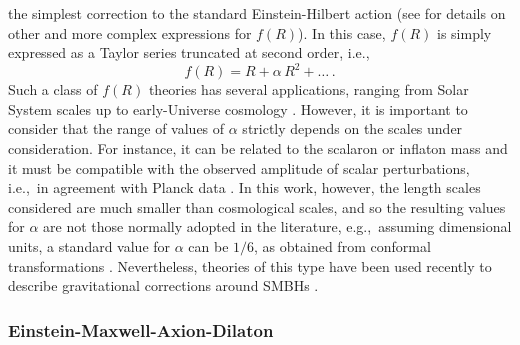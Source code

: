 \documentclass[a4paper,aps,twocolumn,showpacs,showkeys,nofootinbib,preprintnumbers,superscriptaddress,amsmath,amssymb,amsfonts]{revtex4-1}
\newcommand{\ie}{{i.e.,}~}
\newcommand{\eg}{{e.g.,}~}
\begin{document}
the simplest correction to the standard Einstein-Hilbert
action (see \cite{Capozziello2012} for details on other and more complex
expressions for $f(R)$). In this case, $f(R)$ is simply expressed
as a Taylor series truncated at second order, \ie
%
\begin{equation} \label{fRL}
f(R) = R + \alpha\, R^2 + \ldots \,.
\end{equation}
%
Such a class of $f(R)$ theories has several applications, ranging from
Solar System scales up to early-Universe cosmology
\citep{DeLaurentis2015}. However, it is important to consider that the
range of values of $\alpha$ strictly depends on the scales under
consideration. For instance, it can be related to the scalaron or
inflaton mass and it must be compatible with the observed
amplitude of scalar perturbations, \ie in agreement with Planck
data \cite{Planck2016a,BICEP2014}.
In this work, however, the
length scales considered are much smaller than cosmological
scales, and so the resulting values for $\alpha$ are not those normally
adopted in the literature, 
\eg assuming dimensional units, a standard value for $\alpha$ can be $1/6$,
as obtained from conformal transformations \citep[see][for further details]{Birell82}. 
Nevertheless, theories of this type have been used recently
to describe gravitational corrections around SMBHs
\citep{Borka2016,Capozziello2014, Hees2017}.

\subsubsection{Einstein-Maxwell-Axion-Dilaton}
\label{tre.due.quattro}
\end{document}
